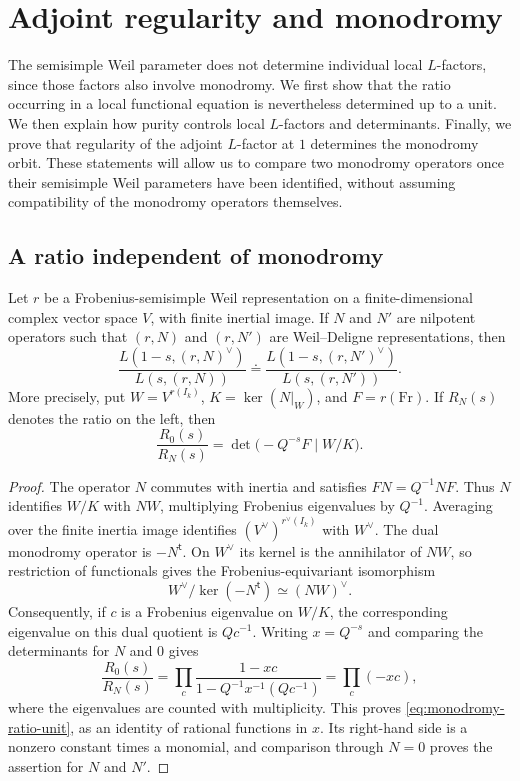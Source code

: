 \section{Adjoint regularity and monodromy}
\label{sec:monodromy}

The semisimple Weil parameter does not determine individual local
$L$-factors, since those factors also involve monodromy.  We first show
that the ratio occurring in a local functional equation is nevertheless
determined up to a unit.  We then explain how purity controls local
$L$-factors and determinants.  Finally, we prove that regularity of the
adjoint $L$-factor at $1$ determines the monodromy orbit.  These statements
will allow us to compare two monodromy operators once their semisimple
Weil parameters have been identified, without assuming compatibility of
the monodromy operators themselves.

\subsection{A ratio independent of monodromy}

\begin{lemma}\label{lem:monodromy-ratio}
Let $r$ be a Frobenius-semisimple Weil representation on a
finite-dimensional complex vector space $V$, with finite inertial
image.  If $N$ and $N'$ are nilpotent operators such that $(r,N)$ and
$(r,N')$ are Weil--Deligne representations, then
\[
 \frac{L(1-s,(r,N)^\vee)}{L(s,(r,N))}
 \doteq
 \frac{L(1-s,(r,N')^\vee)}{L(s,(r,N'))}.
\]
More precisely, put $W=V^{r(I_k)}$, $K=\ker(N|_W)$, and
$F=r(\mathrm{Fr})$.  If $R_N(s)$ denotes the ratio on the left, then
\begin{equation}\label{eq:monodromy-ratio-unit}
 \frac{R_0(s)}{R_N(s)}
   =\det\bigl(-Q^{-s}F\mid W/K\bigr).
\end{equation}
\end{lemma}

\begin{proof}
The operator $N$ commutes with inertia and satisfies
$FN=Q^{-1}NF$.  Thus $N$ identifies $W/K$ with $NW$, multiplying
Frobenius eigenvalues by $Q^{-1}$.  Averaging over the finite inertia
image identifies $(V^\vee)^{r^\vee(I_k)}$ with $W^\vee$.
The dual monodromy operator is $-N^{\mathsf t}$.  On $W^\vee$ its
kernel is the annihilator of $NW$, so restriction of functionals gives
the Frobenius-equivariant isomorphism
\[
 W^\vee/\ker(-N^{\mathsf t})\simeq (NW)^\vee.
\]
Consequently, if $c$ is a Frobenius eigenvalue on $W/K$, the
corresponding eigenvalue on this dual quotient is $Qc^{-1}$.
Writing $x=Q^{-s}$ and comparing the determinants for $N$ and $0$
gives
\[
 \frac{R_0(s)}{R_N(s)}
   =\prod_c\frac{1-xc}{1-Q^{-1}x^{-1}(Qc^{-1})}
   =\prod_c(-xc),
\]
where the eigenvalues are counted with multiplicity.  This proves
\eqref{eq:monodromy-ratio-unit}, as an identity of rational functions
in $x$.  Its right-hand side is a nonzero constant times a monomial,
and comparison through $N=0$ proves the assertion for $N$ and $N'$.
\end{proof}

